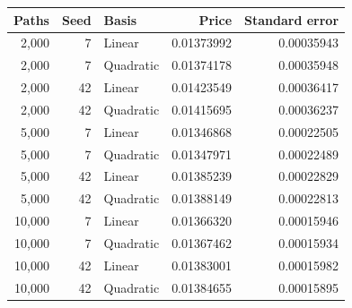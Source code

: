 \begin{tabular}{rrlrr}
\toprule
Paths & Seed & Basis & Price & Standard error \\
\midrule
2,000 & 7 & Linear & 0.01373992 & 0.00035943 \\
2,000 & 7 & Quadratic & 0.01374178 & 0.00035948 \\
2,000 & 42 & Linear & 0.01423549 & 0.00036417 \\
2,000 & 42 & Quadratic & 0.01415695 & 0.00036237 \\
5,000 & 7 & Linear & 0.01346868 & 0.00022505 \\
5,000 & 7 & Quadratic & 0.01347971 & 0.00022489 \\
5,000 & 42 & Linear & 0.01385239 & 0.00022829 \\
5,000 & 42 & Quadratic & 0.01388149 & 0.00022813 \\
10,000 & 7 & Linear & 0.01366320 & 0.00015946 \\
10,000 & 7 & Quadratic & 0.01367462 & 0.00015934 \\
10,000 & 42 & Linear & 0.01383001 & 0.00015982 \\
10,000 & 42 & Quadratic & 0.01384655 & 0.00015895 \\
\bottomrule
\end{tabular}
